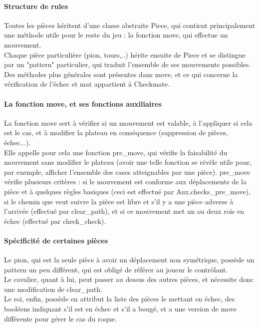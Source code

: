 \documentclass[a4paper]{article}
\begin{document}
\paragraph {Structure de rules} Toutes les pièces héritent d'une classe abstraite Piece, qui contient principalement une méthode utile pour le reste du jeu : la fonction move, qui effectue un mouvement. \\
Chaque pièce particulière (pion, tours,..) hérite ensuite de Piece et se distingue par un "pattern" particulier, qui traduit l'ensemble de ses mouvements possibles.  \\
Des méthodes plus générales sont présentes dans move, et ce qui concerne la vérification de l'échec et mat appartient à Checkmate.

\paragraph {La fonction move, et ses fonctions auxiliaires} La fonction move sert à vérifier si un mouvement est valable, à l'appliquer si cela est le cas, et à modifier la plateau en conséquence (suppression de pièces, échec...). \\
Elle appelle pour cela une fonction pre_move, qui vérifie la faisabilité du mouvement sans modifier le plateau (avoir une telle fonction se révèle utile pour, par exemple, afficher l'ensemble des cases atteignables par une pièce).
pre_move vérifie plusieurs critères : si le mouvement est conforme aux déplacements de la pièce et à quelques règles basiques (ceci est effectué par Aux.checks_pre_move), si le chemin que veut suivre la pièce est libre et s'il y a une pièce adverse à l'arrivée (effectué par clear_path), et si ce mouvement met un ou deux rois en échec (effectué par check_check). \\

\paragraph {Spécificité de certaines pièces} Le pion, qui est la seule pièce à avoir un déplacement non symétrique, possède un pattern un peu différent, qui est obligé de référer au joueur le contrôlant. \\
Le cavalier, quant à lui, peut passer au dessus des autres pièces, et nécessite donc une modification de clear_path. \\
Le roi, enfin, possède en attribut la liste des pièces le mettant en échec, des booléens indiquant s'il est en échec et s'il a bougé, et a une version de move différente pour gérer le cas du roque.  \\
\end{document}
